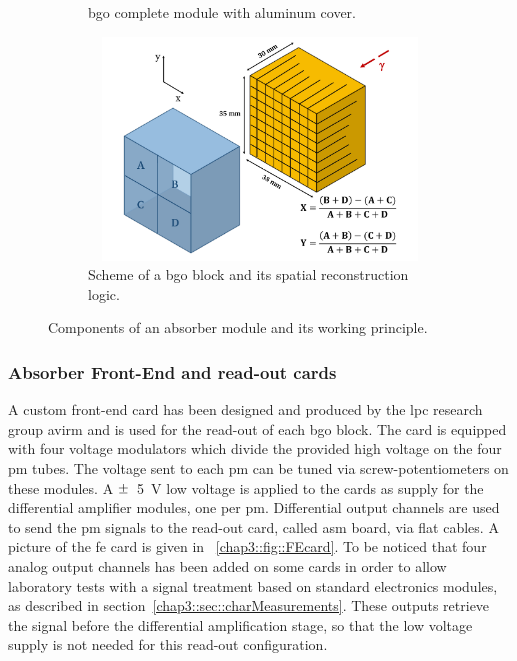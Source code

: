 \begin{figure}
\begin{subfigure}[t]{.5\textwidth}
\caption{\gls{bgo} complete module with aluminum cover.}
\label{chap3::fig::originalBlock_withAl}
\end{subfigure}
\begin{subfigure}[t]{.5\textwidth}
\centering
\includegraphics[width=1\textwidth, height=16em]{03_GraphicFiles/chapter3_CLaRySproto/Absorber/block_scheme.pdf}
\caption{Scheme of a \gls{bgo} block and its spatial reconstruction logic.}
\label{chap3::fig::BGOblockScheme} 
\end{subfigure}
\caption{Components of an absorber module and its working principle.}
\label{chap5::fig::BGO_block}
\end{figure}


\subsubsection{Absorber Front-End and read-out cards}\label{chap3::subsubsec::AbsorberFEcard}

A custom front-end card has been designed and produced by the \gls{lpc} research group \gls{avirm} and is used for the read-out of each \gls{bgo} block. The card is equipped with four voltage modulators which divide the provided high voltage on the four \gls{pm} tubes. The voltage sent to each \gls{pm} can be tuned via screw-potentiometers on these modules. A $\varpm$~5~V low voltage is applied to the cards as supply for the differential amplifier modules, one per \gls{pm}. Differential output channels are used to send the \gls{pm} signals to the read-out card, called \gls{asm} board, via flat cables. A picture of the \gls{fe} card is given in \figurename~\ref{chap3::fig::FEcard}. To be noticed that four analog output channels has been added on some cards in order to allow laboratory tests with a signal treatment based on standard electronics modules, as described in section~\ref{chap3::sec::charMeasurements}. These outputs retrieve the signal before the differential amplification stage, so that the low voltage supply is not needed for this read-out configuration.\\ 


